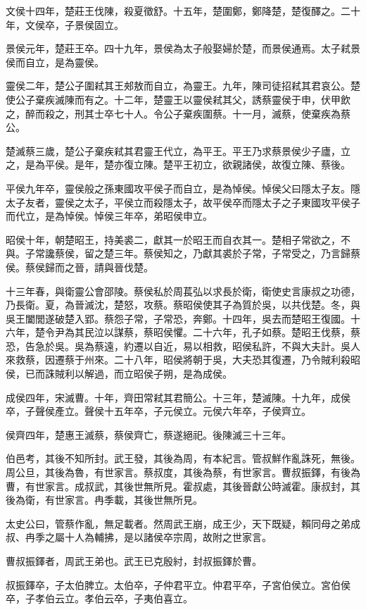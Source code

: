 文侯十四年，楚莊王伐陳，殺夏徵舒。十五年，楚圍鄭，鄭降楚，楚復醳之。二十年，文侯卒，子景侯固立。

景侯元年，楚莊王卒。四十九年，景侯為太子般娶婦於楚，而景侯通焉。太子弒景侯而自立，是為靈侯。

靈侯二年，楚公子圍弒其王郟敖而自立，為靈王。九年，陳司徒招弒其君哀公。楚使公子棄疾滅陳而有之。十二年，楚靈王以靈侯弒其父，誘蔡靈侯于申，伏甲飲之，醉而殺之，刑其士卒七十人。令公子棄疾圍蔡。十一月，滅蔡，使棄疾為蔡公。

楚滅蔡三歲，楚公子棄疾弒其君靈王代立，為平王。平王乃求蔡景侯少子廬，立之，是為平侯。是年，楚亦復立陳。楚平王初立，欲親諸侯，故復立陳、蔡後。

平侯九年卒，靈侯般之孫東國攻平侯子而自立，是為悼侯。悼侯父曰隱太子友。隱太子友者，靈侯之太子，平侯立而殺隱太子，故平侯卒而隱太子之子東國攻平侯子而代立，是為悼侯。悼侯三年卒，弟昭侯申立。

昭侯十年，朝楚昭王，持美裘二，獻其一於昭王而自衣其一。楚相子常欲之，不與。子常讒蔡侯，留之楚三年。蔡侯知之，乃獻其裘於子常，子常受之，乃言歸蔡侯。蔡侯歸而之晉，請與晉伐楚。

十三年春，與衛靈公會邵陵。蔡侯私於周萇弘以求長於衛，衛使史言康叔之功德，乃長衛。夏，為晉滅沈，楚怒，攻蔡。蔡昭侯使其子為質於吳，以共伐楚。冬，與吳王闔閭遂破楚入郢。蔡怨子常，子常恐，奔鄭。十四年，吳去而楚昭王復國。十六年，楚令尹為其民泣以謀蔡，蔡昭侯懼。二十六年，孔子如蔡。楚昭王伐蔡，蔡恐，告急於吳。吳為蔡遠，約遷以自近，易以相救，昭侯私許，不與大夫計。吳人來救蔡，因遷蔡于州來。二十八年，昭侯將朝于吳，大夫恐其復遷，乃令賊利殺昭侯，已而誅賊利以解過，而立昭侯子朔，是為成侯。

成侯四年，宋滅曹。十年，齊田常弒其君簡公。十三年，楚滅陳。十九年，成侯卒，子聲侯產立。聲侯十五年卒，子元侯立。元侯六年卒，子侯齊立。

侯齊四年，楚惠王滅蔡，蔡侯齊亡，蔡遂絕祀。後陳滅三十三年。

伯邑考，其後不知所封。武王發，其後為周，有本紀言。管叔鮮作亂誅死，無後。周公旦，其後為魯，有世家言。蔡叔度，其後為蔡，有世家言。曹叔振鐸，有後為曹，有世家言。成叔武，其後世無所見。霍叔處，其後晉獻公時滅霍。康叔封，其後為衛，有世家言。冉季載，其後世無所見。

太史公曰，管蔡作亂，無足載者。然周武王崩，成王少，天下既疑，賴同母之弟成叔、冉季之屬十人為輔拂，是以諸侯卒宗周，故附之世家言。

曹叔振鐸者，周武王弟也。武王已克殷紂，封叔振鐸於曹。

叔振鐸卒，子太伯脾立。太伯卒，子仲君平立。仲君平卒，子宮伯侯立。宮伯侯卒，子孝伯云立。孝伯云卒，子夷伯喜立。

